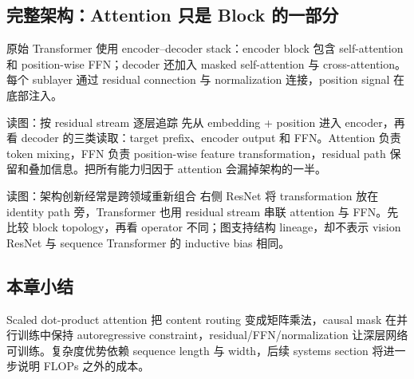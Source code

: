 
\subsection{完整架构：Attention 只是 Block 的一部分}

原始 Transformer 使用 encoder--decoder stack：encoder block 包含 self-attention 和 position-wise FFN；decoder 还加入 masked self-attention 与 cross-attention。每个 sublayer 通过 residual connection 与 normalization 连接，position signal 在底部注入。


\begin{knowledgebox}{读图：按 residual stream 逐层追踪}
先从 embedding + position 进入 encoder，再看 decoder 的三类读取：target prefix、encoder output 和 FFN。Attention 负责 token mixing，FFN 负责 position-wise feature transformation，residual path 保留和叠加信息。把所有能力归因于 attention 会漏掉架构的一半。
\end{knowledgebox}


\begin{knowledgebox}{读图：架构创新经常是跨领域重新组合}
右侧 ResNet 将 transformation 放在 identity path 旁，Transformer 也用 residual stream 串联 attention 与 FFN。先比较 block topology，再看 operator 不同；图支持结构 lineage，却不表示 vision ResNet 与 sequence Transformer 的 inductive bias 相同。
\end{knowledgebox}


\subsection{本章小结}

Scaled dot-product attention 把 content routing 变成矩阵乘法，causal mask 在并行训练中保持 autoregressive constraint，residual/FFN/normalization 让深层网络可训练。复杂度优势依赖 sequence length 与 width，后续 systems section 将进一步说明 FLOPs 之外的成本。


